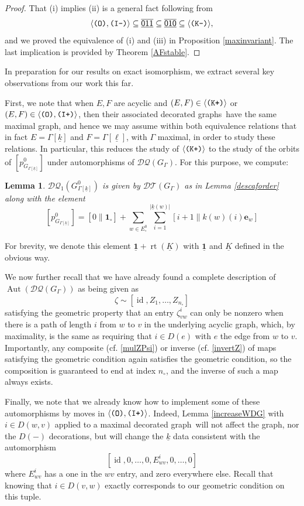 \documentclass[12pt]{amsbook}%
\newcommand{\rt}{\operatorname{rt}}
\newcommand{\ee}{{\mathbf e}}
\newtheorem{lemma}[theor]{Lemma}
\theoremstyle{defin}
\theoremstyle{remark}
\numberwithin{equation}{chapter}
\numberwithin{theor}{section}
\newcommand{\kk}{\underline{k}}
\newcommand{\myll}{\underline{\ell}}
\newcommand{\kkk}{\underline{K}}
\newcommand{\xyzrel}[1]{\mbox{$\overline{\underline{\mathsf{ #1}}}$}}
\newcommand{\IIIm}{\mbox{\texttt{\textup{(I-)}}}}
\newcommand{\IIIp}{\mbox{\texttt{\textup{(I+)}}}}
\newcommand{\OOO}{\mbox{\texttt{\textup{(O)}}}}
\newcommand{\KKKp}{\mbox{\texttt{\textup{(K+)}}}}
\newcommand{\KKKm}{\mbox{\texttt{\textup{(K-)}}}}
\newcommand{\DT}{\mathcal{DT}}
\newcommand{\DQ}{\mathcal{DQ}}
\newcommand{\DQp}{\mathcal{DQ}_1}
\newcommand{\id}{\operatorname{id}}
\newcommand{\DG}{decorated graph}
\newcommand{\DGs}{decorated graphs}
\newcommand{\oXe}[2]{\left[#1\left\|{#2}\right.\right]}
\newcommand{\singX}{{\circ}}
\newcommand{\uu}{\mathbf{1}}
\newcommand{\uuu}{\underline{\mathbf{1}}}
\newcommand{\nos}{{n_\singX}}
\begin{document}
\begin{proof}
That (i) implies (ii) is a general fact following from
\[
\langle \OOO,\IIIm\rangle\subseteq \xyzrel{011}\subseteq\xyzrel{010}\subseteq\langle \KKKm\rangle,
\]
and we proved the equivalence of (i) and (iii) in Proposition \ref{maxinvariant}. The last implication is provided by Theorem \ref{AFstable}.
\end{proof}


In preparation for our results on exact isomorphism, we extract several key observations from our work this far.

First, we note that when $E,F$ are acyclic and $(E,F)\in\langle \KKKp\rangle$ or $(E,F)\in\langle \OOO,\IIIp\rangle$, then their associated \DGs\ have the same maximal graph, and hence we may assume within both equivalence relations that in fact $E=\Gamma[\kk]$ and $F=\Gamma[\myll]$, with $\Gamma$ maximal, in order to study these relations. In particular, this reduces the study of $\langle \KKKp\rangle$ to the study of the orbits of $[p_{G_{\Gamma[\kk]}}^0]$ under automorphisms of $\DQ(G_{\Gamma})$. For this purpose, we compute:


\begin{lemma}\label{descafunit}
$\DQp(G_{\Gamma[\kk]}^0)$ is given by $\DT(G_\Gamma)$ as in Lemma \ref{descaforder} along with the element
\[
[p_{G_{\Gamma[\kk]}}^0]=\oXe{0}{\uu_{\singX}}+\sum_{w\in E^0_\singX}\sum_{i=1}^{|\kk(w)|} \oXe{i+1}{k(w)(i)\ee_w}
\]
\end{lemma}

For brevity, we denote this element $\uuu+\rt(\kkk)$ with $\uuu$ and $\kkk$ defined in the obvious way.

We now further recall that we have already found a complete description of $\operatorname{Aut}(\DQ(G_\Gamma))$ as being given as 
\[
\zeta\sim [\id,Z_1,\dots, Z_{\nos}]
\]
satisfying the geometric property that an entry $\zeta^i_{vw}$ can only be nonzero when there is a path of length $i$ from $w$ to $v$ in the underlying acyclic graph, which, by maximality, is the same as requiring that $i\in D(e)$ with $e$ the edge from $w$ to $v$. Importantly, any composite (cf. \eqref{mulZPsi}) or inverse (cf. \eqref{invertZ}) of maps satisfying the geometric condition again satisfies the geometric condition, so the composition is guaranteed to end at index $\nos$, and the inverse of such a map always exists.

Finally, we note that we already know how to implement some of these  automorphisms by moves in $\langle \OOO,\IIIp\rangle$. Indeed, Lemma \ref{increaseWDG} with $i\in D(w,v)$ applied to a maximal \DG\ will not affect the graph, nor the $D(-)$ decorations, but will change the $\kk$ data consistent with the automorphism 
\[
[\id,0,\dots,0,E^i_{wv},0,\dots,0]
\]
where $E^i_{wv}$ has a one in the $wv$ entry, and zero everywhere else. Recall that knowing that $i\in D(v,w)$ exactly corresponds to our geometric condition on this tuple.
\end{document}
